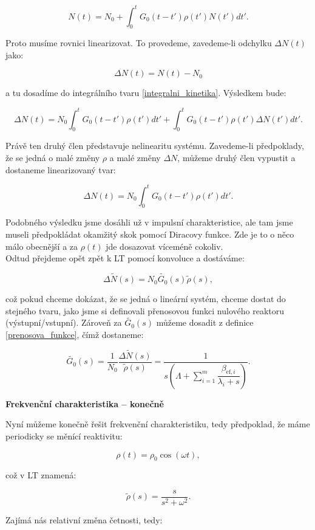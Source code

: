 $$ N(t) = N_0 + \int_0^t G_0(t-t') \rho(t') N(t')dt'. $$

Proto musíme rovnici linearizovat. To provedeme, zavedeme-li odchylku $\Delta N(t)$ jako:

$$ \Delta N(t) = N(t) - N_0 $$

a tu dosadíme do integrálního tvaru \eqref{integralni_kinetika}. Výsledkem bude:

$$ \Delta N(t) = N_0 \int_0^t G_0(t-t') \rho(t') dt' + \int_0^t G_0(t-t') \rho(t') \Delta N(t')dt'. $$

Právě ten druhý člen představuje nelinearitu systému. Zavedeme-li předpoklady, že se jedná o malé změny $\rho$ a malé změny $\Delta N$, můžeme druhý člen vypustit a dostaneme linearizovaný tvar:

\begin{equation}
  \boxed{
  \Delta N(t) = N_0 \int_0^t G_0(t-t') \rho(t') dt'.
  \label{linearizovana_kinetika}}
\end{equation}

Podobného výsledku jsme dosáhli už v impulsní charakteristice, ale tam jsme museli předpokládat okamžitý skok pomocí Diracovy funkce. Zde je to o něco málo obecnější a za $\rho(t)$ jde dosazovat víceméně cokoliv.\\

Odtud přejdeme opět zpět k LT pomocí konvoluce a dostáváme:

$$ \Delta \tilde{N}(s) = N_0 \tilde{G_0}(s) \tilde{\rho} (s), $$

což pokud chceme dokázat, že se jedná o lineární systém, chceme dostat do stejného tvaru, jako jsme si definovali přenosovou funkci nulového reaktoru (výstupní/vstupní). Zároveň za $\tilde{G_0}(s)$ můžeme dosadit z definice \eqref{prenosova_funkce}, čímž dostaneme:

$$ \tilde{G_0}(s) = \dfrac{1}{N_0} \dfrac{\Delta \tilde{N}(s)} {\tilde{\rho}(s)} = \dfrac{1}{s \left ( \Lambda + \sum_{i=1}^m \dfrac{\beta_{\text{ef},i}}{\lambda_i + s} \right )}.$$

\textbf{Frekvenční charakteristika -- konečně}

Nyní můžeme konečně řešit frekvenční charakteristiku, tedy předpoklad, že máme periodicky se měnící reaktivitu:

$$ \rho(t) = \rho_0 \cos (\omega t), $$

což v LT znamená:

$$ \tilde{\rho}(s) = \dfrac{s}{s^2 + \omega^2}. $$

Zajímá nás relativní změna četnosti, tedy:

